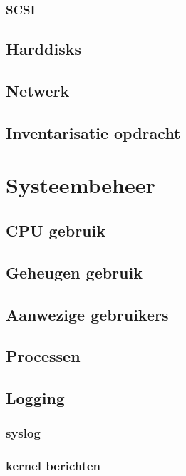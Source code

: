 \documentclass[a4paper,12pt,twoside,openright,titlepage]{book}
\begin{document}
\subsection{SCSI}

\section{Harddisks}





\section{Netwerk}

\section{Inventarisatie opdracht}


\chapter{Systeembeheer}

\section{CPU gebruik}

\section{Geheugen gebruik}

\section{Aanwezige gebruikers}

\section{Processen}



\section{Logging}

\subsection{syslog}

\subsection{kernel berichten}

\end{document}
